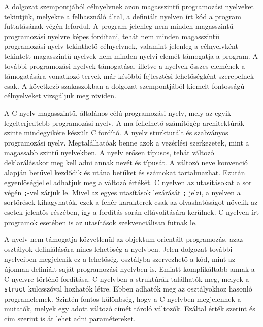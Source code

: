 

A dolgozat szempontjából célnyelvnek azon magasszintű programozási nyelveket tekintjük, melyekre a felhasználó által, a definiált nyelven írt kód a program futtatásának végén lefordul. A program jelenleg nem minden magasszintű programozási nyelvre képes fordítani, tehát nem minden magasszintű programozási nyelv tekinthető célnyelvnek, valamint jelenleg a célnyelvként tekintett magasszintű nyelvek nem minden nyelvi elemét támogatja a program.
A további programozási nyelvek támogatása, illetve a nyelvek összes elemének a támogatására vonatkozó tervek már későbbi fejlesztési lehetőségként szerepelnek csak.
A következő szakaszokban a dolgozat szempontjából kiemelt fontosságú célnyelveket vizsgáljuk meg röviden.


A C nyelv magasszintű, általános célú programozási nyelv, mely az egyik legelterjedtebb programozási nyelv.
A ma fellelhető számítógép architektúrák szinte mindegyikére készült C fordító.
A nyelv sturkturált és szabványos programozási nyelv.
Megtalálhatóak benne azok a vezérlési szerkezetek, mint a magassabb szintű nyelvekben.
A nyelv erősen típusos, tehát változó deklarálásakor meg kell adni annak nevét és típusát.
A változó neve konvenció alapján betűvel kezdődik és utána betűket és számokat tartalmazhat.
Ezután egyenlőségjellel adhatjuk meg a változó értékét.
C nyelven az utasításokat a sor végén \texttt{;}-vel zárjuk le.
Mivel az egyes utasítások lezárását \texttt{;} jelzi, a nyelven a sortörések kihagyhatók, ezek a fehér karakterek csak az olvashatóságot növelik az esetek jelentős részében, így a fordítás során eltávolítására kerülnek.
C nyelven írt programok esetében is az utasítások szekvenciálisan futnak le.

A nyelv nem támogatja közvetlenül az objektum orientált programozás, azaz osztályok definiálására nincs lehetőség a nyelvben.
Jelen dolgozat további nyelveiben megjelenik ez a lehetőség, osztályba szervezhető a kód, mint az újonnan definiált saját programozási nyelvben is.
Emiatt komplikáltabb annak a C nyelvre történő fordítása.
C nyelvben a struktúrák találhatók meg, melyek a \texttt{struct} kulcsszóval hozhatók létre.
Ebben adhatók meg az osztályokhoz hasonló programelemek. Szintén fontos különbség, hogy a C nyelvben megjelennek a mutatók, melyek egy adott változó címét tároló változók. Ezáltal érték szerint és cím szerint is át lehet adni paramétereket.

